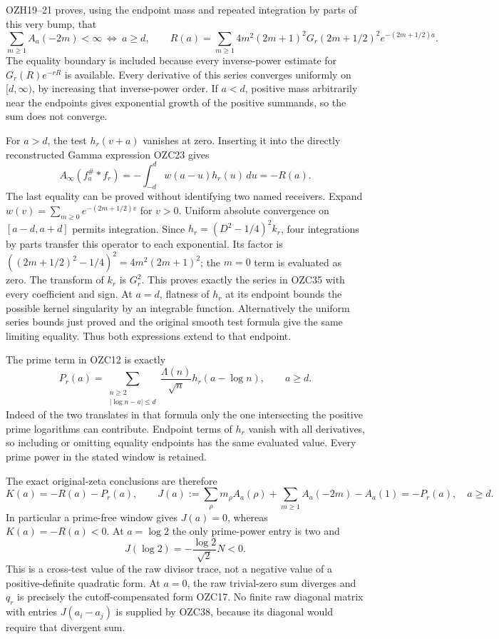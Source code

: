 \documentclass[
  10pt,
  a4paper,
]{article}
\begin{document}
OZH19--21 proves, using the endpoint mass and repeated integration by
parts of this very bump, that \[
\sum_{m\ge1}A_a(-2m)<\infty\ \Longleftrightarrow\ a\ge d,
\qquad
R(a)=\sum_{m\ge1}4m^2(2m+1)^2G_r(2m+1/2)^2e^{-(2m+1/2)a}.
\tag{OZC35}
\] The equality boundary is included because every inverse-power
estimate for \(G_r(R)e^{-rR}\) is available. Every derivative of this
series converges uniformly on \([d,\infty)\), by increasing that
inverse-power order. If \(a<d\), positive mass arbitrarily near the
endpoints gives exponential growth of the positive summands, so the sum
does not converge.

For \(a>d\), the test \(h_r(v+a)\) vanishes at zero. Inserting it into
the directly reconstructed Gamma expression OZC23 gives \[
A_\infty(f_a^\#*f_r)=-\int_{-d}^{d}w(a-u)h_r(u)\,du=-R(a).
\tag{OZC36}
\] The last equality can be proved without identifying two named
receivers. Expand \(w(v)=\sum_{m\ge0}e^{-(2m+1/2)v}\) for \(v>0\).
Uniform absolute convergence on \([a-d,a+d]\) permits integration. Since
\(h_r=(D^2-1/4)^2k_r\), four integrations by parts transfer this
operator to each exponential. Its factor is
\(((2m+1/2)^2-1/4)^2=4m^2(2m+1)^2\); the \(m=0\) term is evaluated as
zero. The transform of \(k_r\) is \(G_r^2\). This proves exactly the
series in OZC35 with every coefficient and sign. At \(a=d\), flatness of
\(h_r\) at its endpoint bounds the possible kernel singularity by an
integrable function. Alternatively the uniform series bounds just proved
and the original smooth test formula give the same limiting equality.
Thus both expressions extend to that endpoint.

The prime term in OZC12 is exactly \[
P_r(a)=\sum_{\substack{n\ge2\\|\log n-a|\le d}}
\frac{\Lambda(n)}{\sqrt n}h_r(a-\log n),\qquad a\ge d.
\tag{OZC37}
\] Indeed of the two translates in that formula only the one
intersecting the positive prime logarithms can contribute. Endpoint
terms of \(h_r\) vanish with all derivatives, so including or omitting
equality endpoints has the same evaluated value. Every prime power in
the stated window is retained.

The exact original-zeta conclusions are therefore \[
\boxed{
K(a)=-R(a)-P_r(a),\qquad
J(a):=\sum_\rho m_\rho A_a(\rho)+\sum_{m\ge1}A_a(-2m)-A_a(1)
=-P_r(a),\quad a\ge d.}
\tag{OZC38}
\] In particular a prime-free window gives \(J(a)=0\), whereas
\(K(a)=-R(a)<0\). At \(a=\log2\) the only prime-power entry is two and
\[
J(\log2)=-\frac{\log2}{\sqrt2}N<0.
\tag{OZC39}
\] This is a cross-test value of the raw divisor trace, not a negative
value of a positive-definite quadratic form. At \(a=0\), the raw
trivial-zero sum diverges and \(q_r\) is precisely the
cutoff-compensated form OZC17. No finite raw diagonal matrix with
entries \(J(a_i-a_j)\) is supplied by OZC38, because its diagonal would
require that divergent sum.
\end{document}
